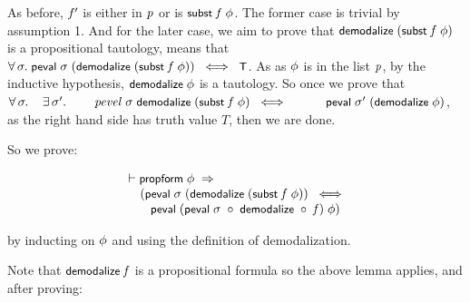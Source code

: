 \documentclass[letterpaper]{article}
\renewcommand{\HOLConst}[1]{{\textsf{\upshape\small #1}}}
\renewcommand{\HOLinline}[1]{\ensuremath{#1}}
\newenvironment{holmath}{\begin{displaymath}\begin{array}{l}}{\end{array}\end{displaymath}\ignorespacesafterend}
\begin{document}
As before, \HOLinline{\HOLFreeVar{f\sp{\prime}}} is either in \HOLinline{\HOLFreeVar{p}} or is \HOLinline{\HOLConst{subst}\;\HOLFreeVar{f}\;\HOLFreeVar{\ensuremath{\phi}}}. The former case is trivial by assumption 1. And for the later case, we aim to prove that \HOLinline{\HOLConst{demodalize}\;(\HOLConst{subst}\;\HOLFreeVar{f}\;\HOLFreeVar{\ensuremath{\phi}})} is a propositional tautology, means that \HOLinline{\HOLSymConst{\HOLTokenForall{}}\HOLBoundVar{\ensuremath{\sigma}}.\;\HOLConst{peval}\;\HOLBoundVar{\ensuremath{\sigma}}\;(\HOLConst{demodalize}\;(\HOLConst{subst}\;\HOLFreeVar{f}\;\HOLFreeVar{\ensuremath{\phi}}))\;\HOLSymConst{\HOLTokenEquiv{}}\;\HOLConst{T}}. As as \HOLinline{\HOLFreeVar{\ensuremath{\phi}}} is in the list \HOLinline{\HOLFreeVar{p}}, by the inductive hypothesis, \HOLinline{\HOLConst{demodalize}\;\HOLFreeVar{\ensuremath{\phi}}} is a tautology. So once we prove that \HOLinline{\HOLSymConst{\HOLTokenForall{}}\HOLBoundVar{\ensuremath{\sigma}}.\\
\;\;\;\;\HOLSymConst{\HOLTokenExists{}}\HOLBoundVar{\ensuremath{\sigma}\sp{\prime}}.\\
\;\;\;\;\;\;\;\;\HOLFreeVar{pevel}\;\HOLBoundVar{\ensuremath{\sigma}}\;\HOLConst{demodalize}\;(\HOLConst{subst}\;\HOLFreeVar{f}\;\HOLFreeVar{\ensuremath{\phi}})\;\HOLSymConst{\HOLTokenEquiv{}}\\
\;\;\;\;\;\;\;\;\;\;\HOLConst{peval}\;\HOLBoundVar{\ensuremath{\sigma}\sp{\prime}}\;(\HOLConst{demodalize}\;\HOLFreeVar{\ensuremath{\phi}})}, as the right hand side has truth value $T$, then we are done.

So we prove:

\begin{holmath}
  \ensuremath{\HOLTokenTurnstile}\HOLConst{propform}\;\HOLFreeVar{\ensuremath{\phi}}\;\HOLSymConst{\HOLTokenImp{}}\\
\;\;\;\;\;(\HOLConst{peval}\;\HOLFreeVar{\ensuremath{\sigma}}\;(\HOLConst{demodalize}\;(\HOLConst{subst}\;\HOLFreeVar{f}\;\HOLFreeVar{\ensuremath{\phi}}))\;\HOLSymConst{\HOLTokenEquiv{}}\\
\;\;\;\;\;\;\;\;\HOLConst{peval}\;(\HOLConst{peval}\;\HOLFreeVar{\ensuremath{\sigma}}\;\HOLSymConst{\HOLTokenCompose}\;\HOLConst{demodalize}\;\HOLSymConst{\HOLTokenCompose}\;\HOLFreeVar{f})\;\HOLFreeVar{\ensuremath{\phi}})
\end{holmath}

by inducting on \HOLinline{\HOLFreeVar{\ensuremath{\phi}}} and using the definition of demodalization.

Note that \HOLinline{\HOLConst{demodalize}\;\HOLFreeVar{f}} is a propositional formula so the above lemma applies, and after proving:
\end{document}
